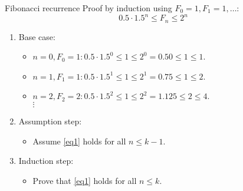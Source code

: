 \documentclass{beamer}
\begin{document}
\begin{frame}{Fibonacci recurrence}
Proof by induction using $F_0 = 1, F_1 = 1, \ldots$:
\begin{equation}\label{eq1}
0.5 \cdot 1.5^n \leq F_n \leq 2^n
\end{equation}
    \begin{enumerate}
        \item Base case: 
        \begin{itemize}
         \item $n=0, F_0=1: 0.5 \cdot 1.5^0 \leq 1 \leq 2^0 = 0.50 \leq 1 \leq 1$.
         \item $n=1, F_1=1: 0.5 \cdot 1.5^1 \leq 1 \leq 2^1 = 0.75 \leq 1 \leq 2$.
         \item $n=2, F_2=2: 0.5 \cdot 1.5^2 \leq 1 \leq 2^2 = 1.125 \leq 2 \leq 4$.
         \\ $\vdots$
        \end{itemize}
        \item Assumption step:
        \begin{itemize}
            \item Assume \eqref{eq1} holds for all $n \leq k - 1$.
        \end{itemize}
        \item Induction step:
        \begin{itemize}
            \item Prove that \eqref{eq1} holds for all $n \leq k$.
        \end{itemize}
    \end{enumerate}
\end{frame}
\end{document}
